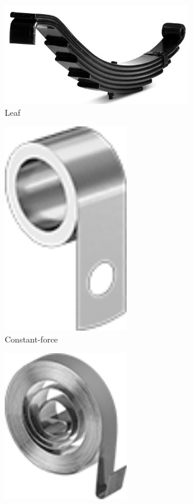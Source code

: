 \begin{figure}[H]
		\begin{subfigure}[b]{.19\linewidth}
			\includegraphics[width=0.9\textwidth]{imgs/spring_leaf.png}
			\caption{Leaf}
		\end{subfigure}\begin{subfigure}[b]{.19\linewidth}
			\includegraphics[width=0.6\textwidth, angle=90]{imgs/spring_conforce.png}
			\caption{Constant-force}
		\end{subfigure}\begin{subfigure}[b]{.19\linewidth}
			\includegraphics[width=0.6\textwidth]{imgs/spring_rotor.png}

\end{subfigure}
\end{figure}
